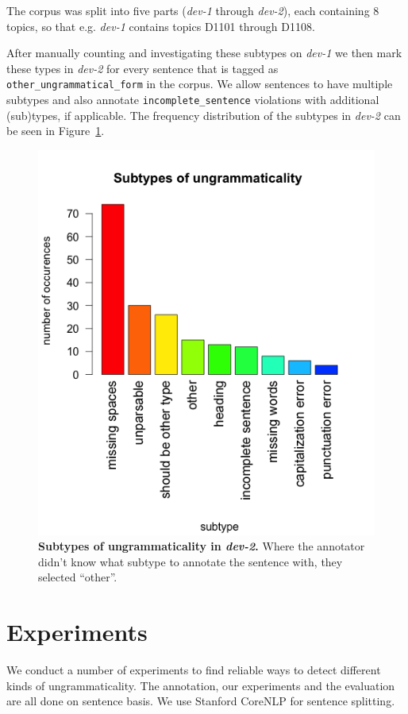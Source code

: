 \documentclass[a4paper,10pt]{scrartcl}
\theoremstyle{style}
\begin{document}
The corpus was split into five parts (\textit{dev-1} through \textit{dev-2}), each containing 8 topics, so that e.g. \textit{dev-1} contains topics D1101 through D1108.

After manually counting and investigating these subtypes on \textit{dev-1} we then mark these types in \textit{dev-2} for every sentence that is tagged as \texttt{other\_ungrammatical\_form} in the corpus. We allow sentences to have multiple subtypes and also annotate \texttt{incomplete\_sentence} violations with additional (sub)types, if applicable. The frequency distribution of the subtypes in \textit{dev-2} can be seen in Figure~\ref{subtypes}.

\begin{figure}
\begin{center}
\includegraphics[scale=0.6]{subtypes_dev2.png}
\end{center}
\caption{\textbf{Subtypes of ungrammaticality in \textit{dev-2}.} Where the annotator didn't know what subtype to annotate the sentence with, they selected ``other''.}
\label{subtypes}
\end{figure}

\section{Experiments}
\label{experiments}
We conduct a number of experiments to find reliable ways to detect different kinds of ungrammaticality. The annotation, our experiments and the evaluation are all done on sentence basis. We use Stanford CoreNLP \citep{manning-EtAl:2014:P14-5} for sentence splitting.
\end{document}
